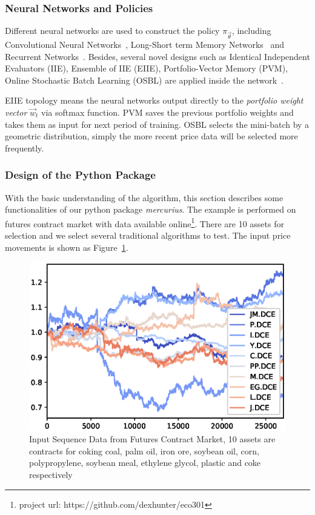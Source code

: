 \subsubsection{Neural Networks and Policies}

Different neural networks are used to construct the policy $\pi_{\vec \theta}$, including Convolutional Neural Networks~\cite{lecun1998gradient}, Long-Short term Memory Networks~\cite{hochreiter1997long} and Recurrent Networks~\cite{jordan1986attractor}. Besides, several novel designs such as Identical Independent Evaluators (IIE), Ensemble of IIE (EIIE), Portfolio-Vector Memory (PVM), Online Stochastic Batch Learning (OSBL) are applied inside the network~\cite{jiang2017deep}. 

EIIE topology means the neural networks output directly to the \emph{portfolio weight vector} $\vec{w}_t$ via softmax function. PVM saves the previous portfolio weights and takes them as input for next period of training. OSBL selects the mini-batch by a geometric distribution, simply the more recent price data will be selected more frequently.


\subsubsection{Design of the Python Package}

With the basic understanding of the algorithm, this section describes some functionalities of our python package \textit{mercurius}. The example is performed on futures contract market with data available online\footnote{project url: https://github.com/dexhunter/eco301}. There are 10 assets for selection and we select several traditional algorithms to test. The input price movements is shown as Figure~\ref{fig:input_data}.

\begin{figure}
    \centering
    \includegraphics{img/input.eps}
    \caption{Input Sequence Data from Futures Contract Market, 10 assets are contracts for coking coal, palm oil, iron ore, soybean oil, corn, polypropylene, soybean meal, ethylene glycol, plastic and coke respectively}
    \label{fig:input_data}
\end{figure}

